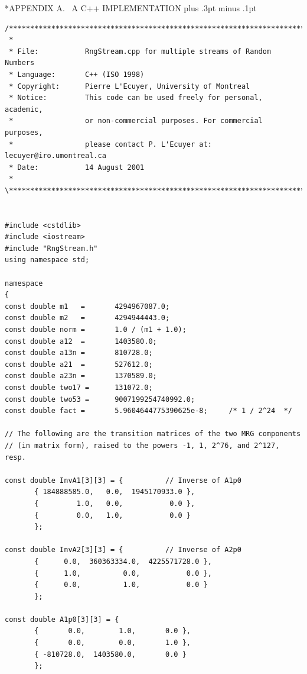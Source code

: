 \documentclass[12pt]{article}
\makeatletter
\newif\iflong\longfalse
\newcommand{\singlespace}{\baselineskip 13.60pt plus .3pt minus .1pt}
\def\section{\@startsection {section}{1}{\z@}{-2.5ex plus -1ex minus
 -.2ex}{2.3ex plus .2ex}{\sfbold}}
\makeatother
\begin{document}
\fi  %

\iflong %
\newpage

\appendix
\section*{APPENDIX A. \ A C++ IMPLEMENTATION}
\singlespace

\begin{verbatim}
/***********************************************************************\
 *
 * File:           RngStream.cpp for multiple streams of Random Numbers
 * Language:       C++ (ISO 1998)
 * Copyright:      Pierre L'Ecuyer, University of Montreal
 * Notice:         This code can be used freely for personal, academic,
 *                 or non-commercial purposes. For commercial purposes, 
 *                 please contact P. L'Ecuyer at: lecuyer@iro.umontreal.ca
 * Date:           14 August 2001
 *
\***********************************************************************/


#include <cstdlib>
#include <iostream>
#include "RngStream.h"
using namespace std;

namespace
{
const double m1   =       4294967087.0;
const double m2   =       4294944443.0;
const double norm =       1.0 / (m1 + 1.0);
const double a12  =       1403580.0;
const double a13n =       810728.0;
const double a21  =       527612.0;
const double a23n =       1370589.0;
const double two17 =      131072.0;
const double two53 =      9007199254740992.0;
const double fact =       5.9604644775390625e-8;     /* 1 / 2^24  */

// The following are the transition matrices of the two MRG components
// (in matrix form), raised to the powers -1, 1, 2^76, and 2^127, resp.

const double InvA1[3][3] = {          // Inverse of A1p0
       { 184888585.0,   0.0,  1945170933.0 },
       {         1.0,   0.0,           0.0 },
       {         0.0,   1.0,           0.0 }
       };

const double InvA2[3][3] = {          // Inverse of A2p0
       {      0.0,  360363334.0,  4225571728.0 },
       {      1.0,          0.0,           0.0 },
       {      0.0,          1.0,           0.0 }
       };

const double A1p0[3][3] = {
       {       0.0,        1.0,       0.0 },
       {       0.0,        0.0,       1.0 },
       { -810728.0,  1403580.0,       0.0 }
       };


\end{verbatim}
\end{document}
